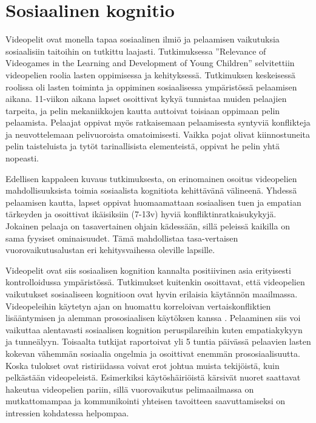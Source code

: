 \documentclass[utf8,bachelor]{gradu3}
\begin{document}
\section{Sosiaalinen kognitio}

Videopelit ovat monella tapaa sosiaalinen ilmiö ja pelaamisen vaikutuksia sosiaalisiin taitoihin on tutkittu laajasti. Tutkimuksessa ''Relevance of Videogames in the Learning and Development of Young Children'' selvitettiin videopelien roolia lasten oppimisessa ja kehityksessä. Tutkimuksen keskeisessä roolissa oli lasten toiminta ja oppiminen sosiaalisessa ympäristössä pelaamisen aikana. 11-viikon aikana lapset osoittivat kykyä tunnistaa muiden pelaajien tarpeita, ja pelin mekaniikkojen kautta auttoivat toisiaan oppimaan pelin pelaamista. Pelaajat oppivat myös ratkaisemaan pelaamisesta syntyviä konflikteja ja neuvottelemaan pelivuoroista omatoimisesti. Vaikka pojat olivat kiinnostuneita pelin taisteluista ja tytöt tarinallisista elementeistä, oppivat he pelin yhtä nopeasti. \parencite{zhao2015relevance} 

Edellisen kappaleen kuvaus tutkimuksesta, on erinomainen osoitus videopelien mahdollisuuksista toimia sosiaalista kognitiota kehittävänä välineenä. Yhdessä pelaamisen kautta, lapset oppivat huomaamattaan sosiaalisen tuen ja empatian tärkeyden ja osoittivat ikäisiksiin (7-13v) hyviä konfliktinratkaisukykyjä. Jokainen pelaaja on tasavertainen ohjain kädessään, sillä peleissä kaikilla on sama fyysiset ominaisuudet. Tämä mahdollistaa tasa-vertaisen vuorovaikutusalustan eri kehitysvaihessa oleville lapsille.  

Videopelit ovat siis sosiaalisen kognition kannalta positiivinen asia erityisesti kontrolloidussa ympäristössä. Tutkimukset kuitenkin osoittavat, että videopelien vaikutukset sosiaaliseen kognitioon ovat hyvin erilaisia käytännön maailmassa. Videopeleihin käytetyn ajan on huomattu korreloivan vertaiskonfliktien lisääntymisen ja alemman prososiaalisen käytöksen kanssa \parencite{pujol2016video}. Pelaaminen siis voi vaikuttaa alentavasti sosiaalisen kognition peruspilareihin kuten empatiakykyyn ja tunneälyyn. Toisaalta tutkijat \textcite{kovess2016time} raportoivat yli 5 tuntia päivässä pelaavien lasten kokevan vähemmän sosiaalia ongelmia ja osoittivat enemmän prososiaalisuutta. Koska tulokset ovat ristiriidassa voivat erot johtua muista tekijöistä, kuin pelkästään videopeleistä. Esimerkiksi käytöshäiriöistä kärsivät nuoret saattavat hakeutua videopelien pariin, sillä vuorovaikutus pelimaailmassa on mutkattomampaa ja kommunikointi yhteisen tavoitteen saavuttamiseksi on intressien kohdatessa helpompaa.  
\end{document}
